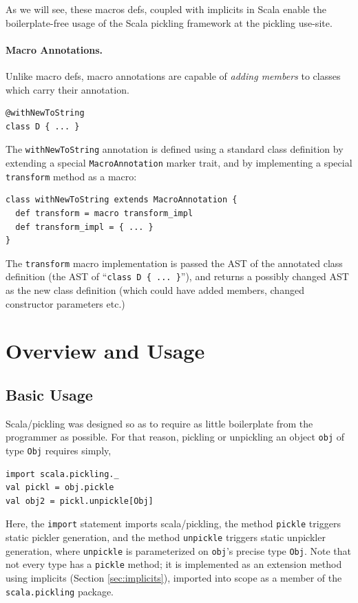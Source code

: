 \documentclass[preprint,10pt]{sigplanconf}
\theoremstyle{definition}
\theoremstyle{definition}
\newcommand{\term}[1]{\mbox{\texttt{#1}}}
\begin{document}
As we will see, these macros defs, coupled with implicits in Scala enable the
boilerplate-free usage of the Scala pickling framework at the pickling use-site.

\paragraph{Macro Annotations.} Unlike macro defs, macro annotations are capable
of {\em adding members} to classes which carry their annotation.

\begin{lstlisting}
@withNewToString
class D { ... }
\end{lstlisting}

The \verb|withNewToString| annotation is defined using a standard class
definition by extending a special \verb|MacroAnnotation| marker trait, and by
implementing a special \verb|transform| method as a macro:

\begin{lstlisting}
class withNewToString extends MacroAnnotation {
  def transform = macro transform_impl
  def transform_impl = { ... }
}
\end{lstlisting}

The \verb|transform| macro implementation is passed the AST of the annotated class
definition (the AST of ``\verb|class D { ... }|''), and returns a possibly changed AST
as the new class definition (which could have added members, changed
constructor parameters etc.)

\section{Overview and Usage}
\label{sec:overview}

\subsection{Basic Usage}

Scala/pickling was designed so as to require as little
boilerplate from the programmer as possible. For that reason, pickling or
unpickling an object \term{obj} of type \term{Obj} requires simply,

\begin{lstlisting}
import scala.pickling._
val pickl = obj.pickle
val obj2 = pickl.unpickle[Obj]
\end{lstlisting}

Here, the \term{import} statement imports scala/pickling,
the method \term{pickle} triggers static pickler generation, and the
method \term{unpickle} triggers static unpickler generation, where
\verb|unpickle| is parameterized on \verb|obj|'s precise type
\verb|Obj|. Note that not
every type has a \term{pickle} method; it is implemented as an extension
method using implicits (Section \ref{sec:implicits}), imported into scope as a
member of the \term{scala.pickling} package.
\end{document}
